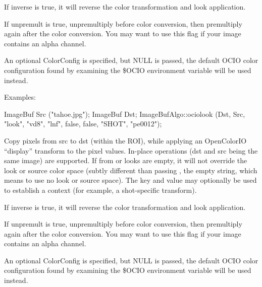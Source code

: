 If {\cf inverse} is {\cf true}, it will reverse the color transformation
and look application.

If {\cf unpremult} is {\cf true}, unpremultiply before color conversion,
then premultiply again after the color conversion.  You may want to use
this flag if your image contains an alpha channel.

An optional {\cf ColorConfig} is specified, but {\cf NULL} is passed, the
default OCIO color configuration found by examining the {\cf \$OCIO}
environment variable will be used instead.

\smallskip
\noindent Examples:
\begin{code}
    ImageBuf Src ("tahoe.jpg");
    ImageBuf Dst;
    ImageBufAlgo::ociolook (Dst, Src, "look", "vd8", "lnf", false, false,
                            "SHOT", "pe0012");
\end{code}
\apiend


 
Copy pixels from {\cf src} to {\cf dst} (within the ROI), while
applying an OpenColorIO ``display'' transform to the pixel values.
In-place operations ({\cf dst} and {\cf src} being the same image)
are supported.  If {\cf from} or {\cf looks} are empty, it will not
override the look or source color space (subtly different than
passing \qkw{}, the empty string, which means to use no look or source
space).  The {\cf key} and {\cf value} may optionally be used
to establish a context (for example, a shot-specific transform).

If {\cf inverse} is {\cf true}, it will reverse the color transformation
and look application.

If {\cf unpremult} is {\cf true}, unpremultiply before color conversion,
then premultiply again after the color conversion.  You may want to use
this flag if your image contains an alpha channel.

An optional {\cf ColorConfig} is specified, but {\cf NULL} is passed, the
default OCIO color configuration found by examining the {\cf \$OCIO}
environment variable will be used instead.


